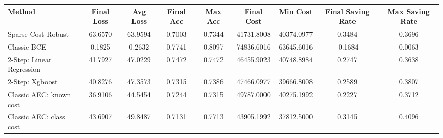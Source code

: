 \begin{tabular}{lcccccccc}
\toprule
Method & Final Loss & Avg Loss & Final Acc & Max Acc & Final Cost & Min Cost & Final Saving Rate & Max Saving Rate \\
\midrule
Sparse-Cost-Robust & 63.6570 & 63.9594 & 0.7003 & 0.7344 & 41731.8008 & 40374.0977 & 0.3484 & 0.3696 \\
Classic BCE & 0.1825 & 0.2632 & 0.7741 & 0.8097 & 74836.6016 & 63645.6016 & -0.1684 & 0.0063 \\
2-Step: Linear Regression & 41.7927 & 47.0229 & 0.7472 & 0.7472 & 46455.9023 & 40748.8984 & 0.2747 & 0.3638 \\
2-Step: Xgboost & 40.8276 & 47.3573 & 0.7315 & 0.7386 & 47466.0977 & 39666.8008 & 0.2589 & 0.3807 \\
Classic AEC: known cost & 36.9106 & 44.5454 & 0.7244 & 0.7315 & 49787.0000 & 40275.1992 & 0.2227 & 0.3712 \\
Classic AEC: class cost & 43.6907 & 49.8487 & 0.7131 & 0.7713 & 43905.1992 & 37812.5000 & 0.3145 & 0.4096 \\
\bottomrule
\end{tabular}
